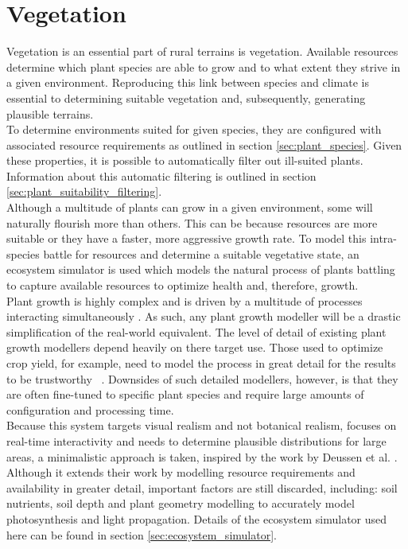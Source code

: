 \chapter{Vegetation} \label{chap:vegetation}

Vegetation is an essential part of rural terrains is vegetation. Available resources determine which plant species are able to grow and to what extent they strive in a given environment. Reproducing this link between species and climate is essential to determining suitable vegetation and, subsequently, generating plausible terrains. \\

To determine environments suited for given species, they are configured with associated resource requirements as outlined in section \ref{sec:plant_species}. Given these properties, it is possible to automatically filter out ill-suited plants. Information about this automatic filtering is outlined in section \ref{sec:plant_suitability_filtering}.\\

Although a multitude of plants can grow in a given environment, some will naturally flourish more than others. This can be because resources are more suitable or they have a faster, more aggressive growth rate. To model this intra-species battle for resources and  determine a suitable vegetative state, an ecosystem simulator is used which models the natural process of plants battling to capture available resources to optimize health and, therefore, growth.\\
Plant growth is highly complex and is driven by a multitude of processes interacting simultaneously \cite{Fourcaud2008}. As such, any plant growth modeller will be a drastic simplification of the real-world equivalent. The level of detail of existing plant growth modellers depend heavily on there target use. Those used to optimize crop yield, for example, need to model the process in great detail for the results to be trustworthy ~\cite{Soler2001,Soler2003,Yan2004}. Downsides of such detailed modellers, however, is that they are often fine-tuned to specific plant species and require large amounts of configuration and processing time.\\
Because this system targets visual realism and not botanical realism, focuses on real-time interactivity and needs to determine plausible distributions for large areas, a minimalistic approach is taken, inspired by the work by Deussen et al. \cite{Deussen1998}. Although it extends their work by modelling resource requirements and availability in greater detail, important factors are still discarded, including: soil nutrients, soil depth and plant geometry modelling to accurately model photosynthesis and light propagation. Details of the ecosystem simulator used here can be found in section \ref{sec:ecosystem_simulator}.\\

